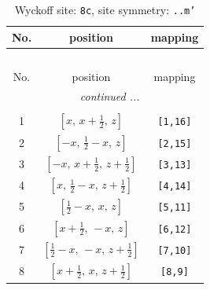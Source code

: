 \documentclass[fleqn,8pt]{jsarticle}
\begin{document}
\renewcommand{\arraystretch}{1.2}
\begin{longtable}{ccc}
\caption{Wyckoff site: {\tt 8c}, site symmetry: {\tt ..m'}}
 \\
 \hline \hline
No. & position & mapping \\ \hline \endfirsthead

\multicolumn{2}{l}{\tablename\ \thetable{}} \\
 \hline \hline
No. & position & mapping \\ \hline \endhead

 \hline \hline
\multicolumn{2}{r}{\footnotesize\it continued ...} \\ \endfoot

 \hline \hline
\multicolumn{2}{r}{} \\ \endlastfoot

1 & $\left[ x,\, x + \frac{1}{2},\, z \right]$ & {\tt [1,16]} \\ \hline
2 & $\left[ - x,\, \frac{1}{2} - x,\, z \right]$ & {\tt [2,15]} \\ \hline
3 & $\left[ - x,\, x + \frac{1}{2},\, z + \frac{1}{2} \right]$ & {\tt [3,13]} \\ \hline
4 & $\left[ x,\, \frac{1}{2} - x,\, z + \frac{1}{2} \right]$ & {\tt [4,14]} \\ \hline
5 & $\left[ \frac{1}{2} - x,\, x,\, z \right]$ & {\tt [5,11]} \\ \hline
6 & $\left[ x + \frac{1}{2},\, - x,\, z \right]$ & {\tt [6,12]} \\ \hline
7 & $\left[ \frac{1}{2} - x,\, - x,\, z + \frac{1}{2} \right]$ & {\tt [7,10]} \\ \hline
8 & $\left[ x + \frac{1}{2},\, x,\, z + \frac{1}{2} \right]$ & {\tt [8,9]} \\
\end{longtable}
\renewcommand{\arraystretch}{1.2}
\end{document}
